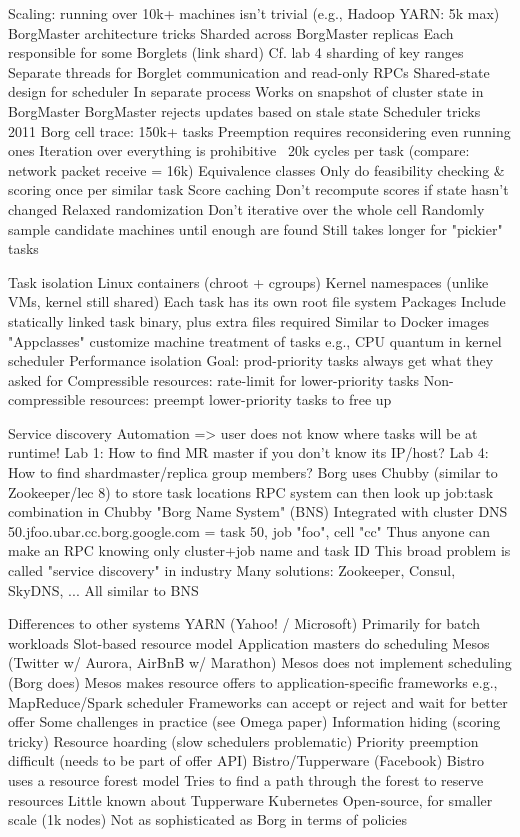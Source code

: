 Scaling: running over 10k+ machines isn't trivial (e.g., Hadoop YARN: 5k max)
  BorgMaster architecture tricks
    Sharded across BorgMaster replicas
      Each responsible for some Borglets (link shard)
      Cf. lab 4 sharding of key ranges
    Separate threads for Borglet communication and read-only RPCs
    Shared-state design for scheduler
      In separate process
      Works on snapshot of cluster state in BorgMaster
      BorgMaster rejects updates based on stale state
  Scheduler tricks
    2011 Borg cell trace: 150k+ tasks
      Preemption requires reconsidering even running ones
    Iteration over everything is prohibitive
      ~20k cycles per task (compare: network packet receive = 16k)
    Equivalence classes
      Only do feasibility checking & scoring once per similar task
    Score caching
      Don't recompute scores if state hasn't changed
    Relaxed randomization
      Don't iterative over the whole cell
      Randomly sample candidate machines until enough are found
      Still takes longer for "pickier" tasks

Task isolation
  Linux containers (chroot + cgroups)
    Kernel namespaces (unlike VMs, kernel still shared)
    Each task has its own root file system
  Packages
    Include statically linked task binary, plus extra files required
    Similar to Docker images
  "Appclasses" customize machine treatment of tasks
    e.g., CPU quantum in kernel scheduler
  Performance isolation
    Goal: prod-priority tasks always get what they asked for
    Compressible resources: rate-limit for lower-priority tasks
    Non-compressible resources: preempt lower-priority tasks to free up

Service discovery
  Automation => user does not know where tasks will be at runtime!
    Lab 1: How to find MR master if you don't know its IP/host?
    Lab 4: How to find shardmaster/replica group members?
  Borg uses Chubby (similar to Zookeeper/lec 8) to store task locations
    RPC system can then look up job:task combination in Chubby
  "Borg Name System" (BNS)
    Integrated with cluster DNS
    50.jfoo.ubar.cc.borg.google.com = task 50, job "foo", cell "cc"
  Thus anyone can make an RPC knowing only cluster+job name and task ID
  This broad problem is called "service discovery" in industry
    Many solutions: Zookeeper, Consul, SkyDNS, ...
    All similar to BNS

Differences to other systems
  YARN (Yahoo! / Microsoft)
    Primarily for batch workloads
    Slot-based resource model
    Application masters do scheduling
  Mesos (Twitter w/ Aurora, AirBnB w/ Marathon)
    Mesos does not implement scheduling (Borg does)
    Mesos makes resource offers to application-specific frameworks
      e.g., MapReduce/Spark scheduler
      Frameworks can accept or reject and wait for better offer
    Some challenges in practice (see Omega paper)
      Information hiding (scoring tricky)
      Resource hoarding (slow schedulers problematic)
      Priority preemption difficult (needs to be part of offer API)
  Bistro/Tupperware (Facebook)
    Bistro uses a resource forest model
    Tries to find a path through the forest to reserve resources
    Little known about Tupperware
  Kubernetes
    Open-source, for smaller scale (1k nodes)
    Not as sophisticated as Borg in terms of policies

